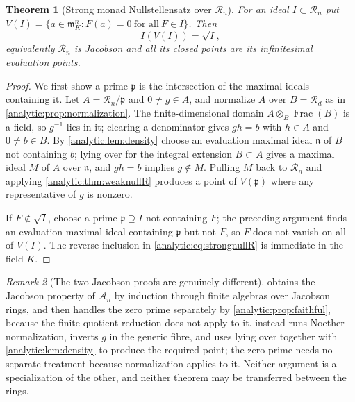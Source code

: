 \documentclass[11pt,letterpaper]{article}
\newtheorem{theorem}{Theorem}[section]
\theoremstyle{definition}
\theoremstyle{remark}
\newtheorem{remark}[theorem]{Remark}
\newcommand{\A}{\mathscr A}
\newcommand{\RR}{\mathscr R}
\newcommand{\m}{\mathfrak m}
\newcommand{\pp}{\mathfrak p}
\newcommand{\Frac}{\operatorname{Frac}}
\numberwithin{equation}{section}
\begin{document}
\begin{theorem}[Strong monad Nullstellensatz over $\RR_n$]
\label{analytic:thm:strongnullR}
For an ideal $I\subset\RR_n$ put
$V(I)=\{a\in\m_K^n:F(a)=0\ \text{for all}\ F\in I\}$. Then
\begin{equation}\label{analytic:eq:strongnullR}
 I(V(I))=\sqrt I ,
\end{equation}
equivalently $\RR_n$ is Jacobson and all its closed points are its
infinitesimal evaluation points.
\end{theorem}
\begin{proof}
We first show a prime $\pp$ is the intersection of the maximal ideals
containing it. Let $A=\RR_n/\pp$ and $0\ne g\in A$, and normalize $A$ over
$B=\RR_d$ as in \cref{analytic:prop:normalization}. The finite-dimensional
domain $A\otimes_B\Frac(B)$ is a field, so $g^{-1}$ lies in it; clearing a
denominator gives $gh=b$ with $h\in A$ and $0\ne b\in B$. By
\cref{analytic:lem:density} choose an evaluation maximal ideal
$\mathfrak n$ of $B$ not containing $b$; lying over for the integral
extension $B\subset A$ gives a maximal ideal $M$ of $A$ over
$\mathfrak n$, and $gh=b$ implies $g\notin M$. Pulling $M$ back to $\RR_n$
and applying \cref{analytic:thm:weaknullR} produces a point of $V(\pp)$
where any representative of $g$ is nonzero.

If $F\notin\sqrt I$, choose a prime $\pp\supseteq I$ not containing $F$; the
preceding argument finds an evaluation maximal ideal containing $\pp$ but
not $F$, so $F$ does not vanish on all of $V(I)$. The reverse inclusion in
\eqref{analytic:eq:strongnullR} is immediate in the field $K$.
\end{proof}

\begin{remark}[The two Jacobson proofs are genuinely different]
\label{analytic:rem:two-jacobson}
 obtains the Jacobson property of $\A_n$ by
induction through finite algebras over Jacobson rings, and then handles the
zero prime separately by \cref{analytic:prop:faithful}, because the
finite-quotient reduction does not apply to it.
 instead runs Noether normalization, inverts
$g$ in the generic fibre, and uses lying over together with
\cref{analytic:lem:density} to produce the required point; the zero prime
needs no separate treatment because normalization applies to it. Neither
argument is a specialization of the other, and neither theorem may be
transferred between the rings.
\end{remark}
\end{document}
